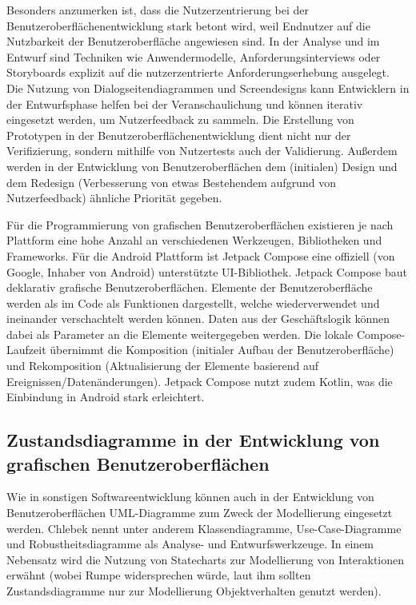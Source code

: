 \documentclass[first=Christoph,last=Hoentzsch,company=Softwareprojekt,location=Dresden,simple, noheader]{baarticle}
\begin{document}
\begin{basimple}
            Besonders anzumerken ist, dass die Nutzerzentrierung bei der Benutzeroberflächenentwicklung stark betont wird, weil Endnutzer auf die Nutzbarkeit der Benutzeroberfläche angewiesen sind.
            In der Analyse und im Entwurf sind Techniken wie Anwendermodelle, Anforderungsinterviews oder Storyboards explizit auf die nutzerzentrierte Anforderungserhebung ausgelegt.
            Die Nutzung von Dialogseitendiagrammen und Screendesigns kann Entwicklern in der Entwurfsphase helfen bei der Veranschaulichung und können iterativ eingesetzt werden, um Nutzerfeedback zu sammeln.
            Die Erstellung von Prototypen in der Benutzeroberflächenentwicklung dient nicht nur der Verifizierung, sondern mithilfe von Nutzertests auch der Validierung.
            Außerdem werden in der Entwicklung von Benutzeroberflächen dem (initialen) Design und dem Redesign (Verbesserung von etwas Bestehendem aufgrund von Nutzerfeedback) ähnliche Priorität gegeben.

            Für die Programmierung von grafischen Benutzeroberflächen existieren je nach Plattform eine hohe Anzahl an verschiedenen Werkzeugen, Bibliotheken und Frameworks.
            Für die Android Plattform ist Jetpack Compose eine offiziell (von Google, Inhaber von Android) unterstützte UI-Bibliothek.
            Jetpack Compose baut deklarativ grafische Benutzeroberflächen.
            Elemente der Benutzeroberfläche werden als im Code als Funktionen dargestellt, welche wiederverwendet und ineinander verschachtelt werden können.
            Daten aus der Geschäftslogik können dabei als Parameter an die Elemente weitergegeben werden.
            Die lokale Compose-Laufzeit übernimmt die Komposition (initialer Aufbau der Benutzeroberfläche) und Rekomposition (Aktualisierung der Elemente basierend auf Ereignissen/Datenänderungen). 
            Jetpack Compose nutzt zudem Kotlin, was die Einbindung in Android stark erleichtert.

            \newpage
        \subsection{Zustandsdiagramme in der Entwicklung von grafischen Benutzeroberflächen}
        Wie in sonstigen Softwareentwicklung können auch in der Entwicklung von Benutzeroberflächen \gls{UML}-Diagramme zum Zweck der Modellierung eingesetzt werden. 
        Chlebek nennt unter anderem Klassendiagramme, Use-Case-Diagramme und Robustheitsdiagramme als Analyse- und Entwurfswerkzeuge. 
        In einem Nebensatz wird die Nutzung von Statecharts zur Modellierung von Interaktionen erwähnt (wobei Rumpe widersprechen würde, laut ihm sollten Zustandsdiagramme nur zur Modellierung Objektverhalten genutzt werden).
        

\end{basimple}
\end{document}
